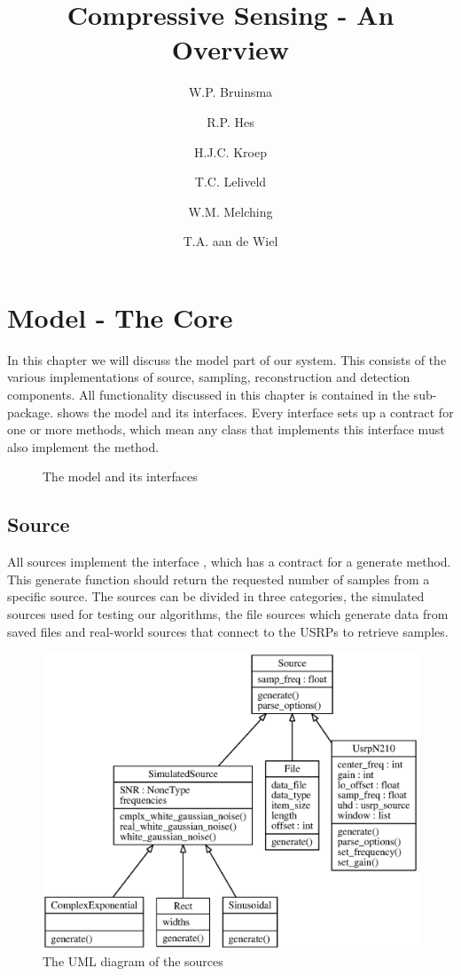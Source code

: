 \documentclass[a4paper, openany, oneside]{memoir}
\title{Compressive Sensing - An Overview}
\author{W.P. Bruinsma \and R.P. Hes \and H.J.C. Kroep \and T.C. Leliveld \and W.M. Melching \and T.A. aan de Wiel}
\begin{document}
\chapter{Model - The Core}
\label{cha:model}
In this chapter we will discuss the model part of our system. This consists of the various implementations of source, sampling, reconstruction and detection components. All functionality discussed in this chapter is contained in the  sub-package.  shows the model and its interfaces. Every interface sets up a contract for one or more methods, which mean any class that implements this interface must also implement the method.

\begin{figure}
    \centering
    \begin{adjustbox}{width=\textwidth}
    
    \end{adjustbox}
    \caption{The model and its interfaces}
    \label{fig:model-diagram}
\end{figure}

\section{Source}
\label{sec:source}
All sources implement the interface , which has a contract for a generate method. This generate function should return the requested number of samples from a specific source. The sources can be divided in three categories, the simulated sources used for testing our algorithms, the file sources which generate data from saved files and real-world sources that connect to the USRPs to retrieve samples.

\begin{figure}
    \centering
    \includegraphics[width=\linewidth]{figures/classes_source.eps}
    \caption{The UML diagram of the sources}
    \label{fig:umlsource}
\end{figure}
\end{document}
